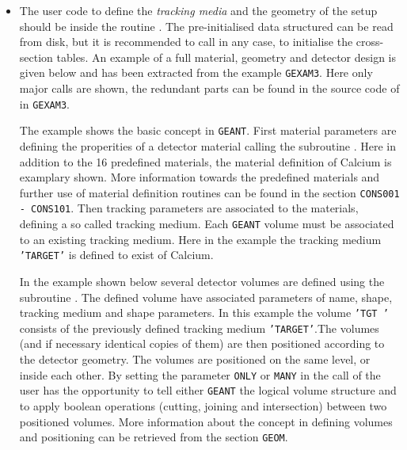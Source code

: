 \begin{itemize}
\item The user code to define the {\it tracking media} and the geometry
of the setup should be inside the routine . The pre-initialised
data structured can be read from disk, but it is recommended to call 
 in any case, to initialise the cross-section tables. An 
example of a full material, geometry and detector design is given below
and has been extracted from the example {\tt GEXAM3}. Here only major
calls are shown, the redundant parts can be found in the source code
of  in {\tt GEXAM3}. 

The example shows the basic concept in 
{\tt GEANT}. First material parameters are defining the properities of
a detector material calling the subroutine . 
Here in addition to the 16 predefined materials, the material definition of
Calcium is examplary shown. More information towards the predefined materials
and further use of material definition routines can be found in the 
section {\tt CONS001 - CONS101}.
Then tracking parameters are associated to the materials, defining
a so called tracking medium. Each {\tt GEANT}  volume must be 
associated to an existing tracking medium. Here in the example the
tracking medium {\tt 'TARGET'} is defined to exist of Calcium.
 
In the example shown below several
detector volumes are defined using the subroutine .
The defined volume have associated parameters of name, shape,
tracking medium and shape parameters.
In this example the volume {\tt 'TGT '} consists of the 
previously defined tracking medium {\tt 'TARGET'}.The 
volumes (and if necessary identical copies of them)
are then positioned according to the detector geometry. The 
volumes are positioned on the same level, or inside each other. By
setting the parameter {\tt ONLY} or  {\tt MANY} in the call of  
the user has the opportunity to tell either {\tt GEANT} the logical
volume structure and to apply boolean operations (cutting, joining and
intersection) between two positioned volumes. More information about
the concept in defining volumes and positioning can be retrieved from
the section {\tt GEOM}. 


\end{itemize}
